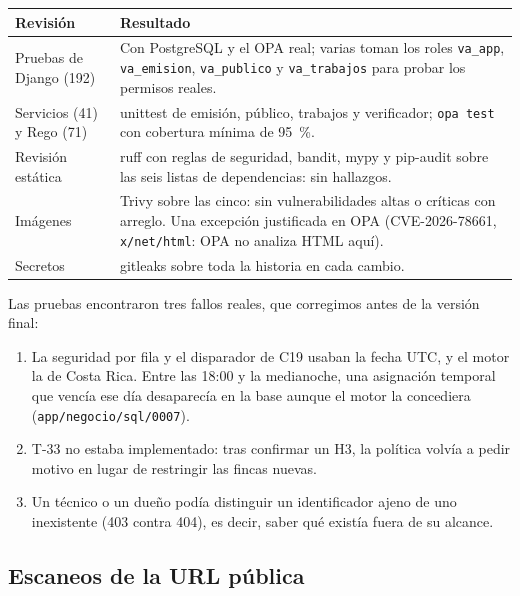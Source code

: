 \documentclass[11pt,letterpaper]{article}
\newcommand{\cab}[1]{\textbf{\rmfamily #1}}
\newcommand{\cod}[1]{\texttt{\small #1}}
\newcommand{\arch}[1]{\texttt{\small #1}}
\begin{document}
\begin{center}
\footnotesize
\begin{tabularx}{\textwidth}{@{}L{4.2cm} Y@{}}
\toprule
\cab{Revisión} & \cab{Resultado} \\
\midrule
Pruebas de Django (192) & Con PostgreSQL y el OPA real; varias toman los roles \cod{va\_app}, \cod{va\_emision}, \cod{va\_publico} y \cod{va\_trabajos} para probar los permisos reales. \\
Servicios (41) y Rego (71) & unittest de emisión, público, trabajos y verificador; \cod{opa test} con cobertura mínima de 95~\%. \\
Revisión estática & ruff con reglas de seguridad, bandit, mypy y pip-audit sobre las seis listas de dependencias: sin hallazgos. \\
Imágenes & Trivy sobre las cinco: sin vulnerabilidades altas o críticas con arreglo. Una excepción justificada en OPA (CVE-2026-78661, \cod{x/net/html}: OPA no analiza HTML aquí). \\
Secretos & gitleaks sobre toda la historia en cada cambio. \\
\bottomrule
\end{tabularx}
\end{center}

Las pruebas encontraron tres fallos reales, que corregimos antes de la versión final:
\begin{enumerate}
  \item La seguridad por fila y el disparador de C19 usaban la fecha UTC, y el motor la de Costa Rica.
    Entre las 18:00 y la medianoche, una asignación temporal que vencía ese día desaparecía en la base
    aunque el motor la concediera (\arch{app/negocio/sql/0007}).
  \item T-33 no estaba implementado: tras confirmar un H3, la política volvía a pedir motivo en lugar
    de restringir las fincas nuevas.
  \item Un técnico o un dueño podía distinguir un identificador ajeno de uno inexistente (403 contra
    404), es decir, saber qué existía fuera de su alcance.
\end{enumerate}

\subsection{Escaneos de la URL pública}\label{sec:escaneos}



\end{document}
